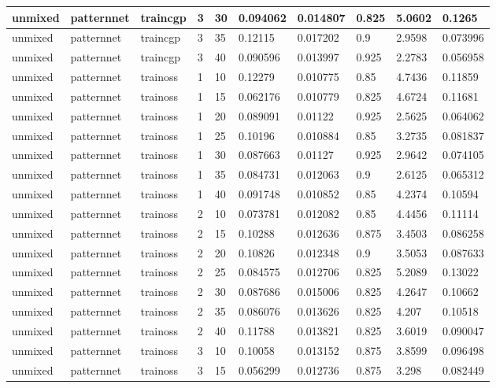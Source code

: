 \begin{longtable}{lllllllll}
unmixed & patternnet & traincgp & 3 & 30 & 0.094062 & 0.014807 & 0.825 & 5.0602 & 0.1265 \\ \hline 
unmixed & patternnet & traincgp & 3 & 35 & 0.12115 & 0.017202 & 0.9 & 2.9598 & 0.073996 \\ \hline 
unmixed & patternnet & traincgp & 3 & 40 & 0.090596 & 0.013997 & 0.925 & 2.2783 & 0.056958 \\ \hline 
unmixed & patternnet & trainoss & 1 & 10 & 0.12279 & 0.010775 & 0.85 & 4.7436 & 0.11859 \\ \hline 
unmixed & patternnet & trainoss & 1 & 15 & 0.062176 & 0.010779 & 0.825 & 4.6724 & 0.11681 \\ \hline 
unmixed & patternnet & trainoss & 1 & 20 & 0.089091 & 0.01122 & 0.925 & 2.5625 & 0.064062 \\ \hline 
unmixed & patternnet & trainoss & 1 & 25 & 0.10196 & 0.010884 & 0.85 & 3.2735 & 0.081837 \\ \hline 
unmixed & patternnet & trainoss & 1 & 30 & 0.087663 & 0.01127 & 0.925 & 2.9642 & 0.074105 \\ \hline 
unmixed & patternnet & trainoss & 1 & 35 & 0.084731 & 0.012063 & 0.9 & 2.6125 & 0.065312 \\ \hline 
unmixed & patternnet & trainoss & 1 & 40 & 0.091748 & 0.010852 & 0.85 & 4.2374 & 0.10594 \\ \hline 
unmixed & patternnet & trainoss & 2 & 10 & 0.073781 & 0.012082 & 0.85 & 4.4456 & 0.11114 \\ \hline 
unmixed & patternnet & trainoss & 2 & 15 & 0.10288 & 0.012636 & 0.875 & 3.4503 & 0.086258 \\ \hline 
unmixed & patternnet & trainoss & 2 & 20 & 0.10826 & 0.012348 & 0.9 & 3.5053 & 0.087633 \\ \hline 
unmixed & patternnet & trainoss & 2 & 25 & 0.084575 & 0.012706 & 0.825 & 5.2089 & 0.13022 \\ \hline 
unmixed & patternnet & trainoss & 2 & 30 & 0.087686 & 0.015006 & 0.825 & 4.2647 & 0.10662 \\ \hline 
unmixed & patternnet & trainoss & 2 & 35 & 0.086076 & 0.013626 & 0.825 & 4.207 & 0.10518 \\ \hline 
unmixed & patternnet & trainoss & 2 & 40 & 0.11788 & 0.013821 & 0.825 & 3.6019 & 0.090047 \\ \hline 
unmixed & patternnet & trainoss & 3 & 10 & 0.10058 & 0.013152 & 0.875 & 3.8599 & 0.096498 \\ \hline 
unmixed & patternnet & trainoss & 3 & 15 & 0.056299 & 0.012736 & 0.875 & 3.298 & 0.082449 \\ \hline 

\end{longtable}
